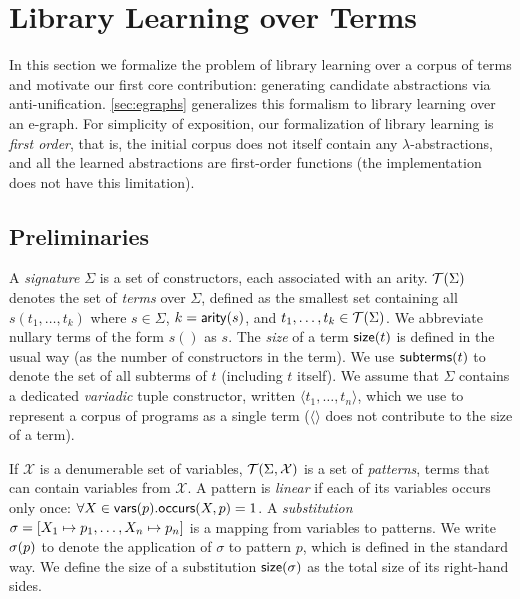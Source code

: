 \section{Library Learning over Terms}\label{sec:au}

In this section
  we formalize the problem of
  library learning over a corpus of terms and
  motivate our first core contribution:
  generating candidate abstractions via anti-unification.
%
\autoref{sec:egraphs} generalizes this formalism to library learning over an e-graph.
%
For simplicity of exposition,
our formalization of library learning is \emph{first order},
that is, the initial corpus does not itself contain any $\lambda$-abstractions,
and all the learned abstractions are first-order functions
(the \tool implementation does not have this limitation).


\subsection{Preliminaries}

%
A \emph{signature} $\Sigma$ is a set of constructors,
each associated with an arity.
%
$\mathcal{T}(\Sigma)$ denotes the set of \emph{terms} over $\Sigma$,
defined as the smallest set containing all $s(t_1,\dots,t_k)$
where $s \in \Sigma$, $k = \mathsf{arity}(s)$, and $t_1,\dots,t_k\in\mathcal{T}(\Sigma)$.
%
We abbreviate nullary terms of the form $s()$ as $s$.
%
The \emph{size} of a term $\mathsf{size}(t)$ is defined in the usual way
(as the number of constructors in the term).
%
We use $\mathsf{subterms}(t)$ to denote the set of all subterms of $t$ (including $t$ itself).
%
We assume that $\Sigma$ contains a dedicated \emph{variadic} tuple constructor,
written $\langle t_1, \ldots, t_n \rangle$,
which we use to represent a corpus of programs as a single term
($\langle \rangle$ does not contribute to the size of a term).

%
If $\mathcal{X}$ is a denumerable set of variables,
$\mathcal{T}(\Sigma,\mathcal{X})$ is a set of \emph{patterns},
\ie terms that can contain variables from $\mathcal{X}$.
%
A pattern is \emph{linear} if each of its variables occurs only once:
$\forall X \in \mathsf{vars}(p) . \mathsf{occurs}(X, p) = 1$.
%
A \emph{substitution} $\sigma = [{X_1} \mapsto {p_1}, \ldots, {X_n} \mapsto {p_n}]$
is a mapping from variables to patterns.
%
%
We write ${\sigma}({p})$ to denote the application of $\sigma$ to pattern $p$,
which is defined in the standard way.
%
We define the size of a substitution $\mathsf{size}(\sigma)$ as the total size of its right-hand sides.

